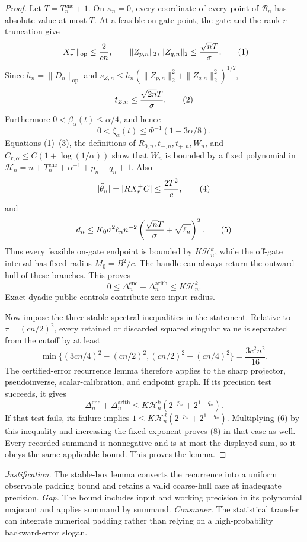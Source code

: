 \documentclass{article}
\begin{document}
\begin{proof}
Let \(T=T_n^{\mathrm{enc}}+1\).  On \(\kappa_n=0\), every coordinate of every
point of \(\mathcal B_n\) has absolute value at most \(T\).  At a feasible
on-gate point, the gate and the rank-\(r\) truncation give
\[
\|X_r^+\|_{
\mathrm{op}}\le {2\over cn},
\qquad
\|Z_{p,n}\|_2,\|Z_{q,n}\|_2\le {\sqrt nT\over\sigma}.               \tag{1}
\]
Since \(h_n=\|D_n\|_{
\mathrm{op}}\) and
\(s_{Z,n}\le h_n(\|Z_{p,n}\|_2^2+\|Z_{q,n}\|_2^2)^{1/2}\),
\[
t_{Z,n}\le {\sqrt{2n}T\over\sigma}.                                 \tag{2}
\]
Furthermore \(0<\beta_\alpha(t)\le\alpha/4\), and hence
\[
0<\zeta_\alpha(t)\le \Phi^{-1}(1-3\alpha/8).                        \tag{3}
\]
Equations (1)--(3), the definitions of \(R_{0,n},t_{-,n},t_{+,n},W_n\), and
\(C_{r,\alpha}\le C(1+\log(1/\alpha))\) show that \(W_n\) is bounded by a
fixed polynomial in
\(\mathcal H_n=n+T_n^{\mathrm{enc}}+\alpha^{-1}+p_n+q_n+1\).
Also
\[
|\widehat\theta_n|=|RX_r^+C|\le {2T^2\over c},                       \tag{4}
\]
and
\[
d_n\le K_0\sigma^2\ell_n n^{-2}
\left({\sqrt nT\over\sigma}+\sqrt{\ell_n}\right)^2.                 \tag{5}
\]
Thus every feasible on-gate endpoint is bounded by
\(K\mathcal H_n^k\), while the off-gate interval has fixed radius
\(M_0=B^2/c\).  The handle can always return the outward hull of these branches.
This proves
\[
0\le\Delta_n^{\mathrm{enc}}+\Delta_n^{\mathrm{arith}}
\le K\mathcal H_n^k.                                                  \tag{6}
\]
Exact-dyadic public controls contribute zero input radius.

Now impose the three stable spectral inequalities in the statement.  Relative
to \(\tau=(cn/2)^2\), every retained or discarded squared singular value is
separated from the cutoff by at least
\[
\min\{(3cn/4)^2-(cn/2)^2,(cn/2)^2-(cn/4)^2\}
=\frac{3c^2n^2}{16}.                                                   \tag{7}
\]
The certified-error recurrence lemma therefore applies to the sharp projector,
pseudoinverse, scalar-calibration, and endpoint graph.  If its precision test
succeeds, it gives
\[
\Delta_n^{\mathrm{enc}}+\Delta_n^{\mathrm{arith}}
\le K\mathcal H_n^k(2^{-p_n}+2^{1-q_n}).                              \tag{8}
\]
If that test fails, its failure implies
\(1\le K\mathcal H_n^d(2^{-p_n}+2^{1-q_n})\).  Multiplying (6) by this
inequality and increasing the fixed exponent proves (8) in that case as well.
Every recorded summand is nonnegative and is at most the displayed sum, so it
obeys the same applicable bound.  This proves the lemma.
\end{proof}
\par\smallskip\noindent \textit{Justification.} The stable-box lemma converts the recurrence into a uniform observable padding bound and retains a valid coarse-hull case at inadequate precision. \textit{Gap.} The bound includes input and working precision in its polynomial majorant and applies summand by summand. \textit{Consumer.} The statistical transfer can integrate numerical padding rather than relying on a high-probability backward-error slogan.
\end{document}

